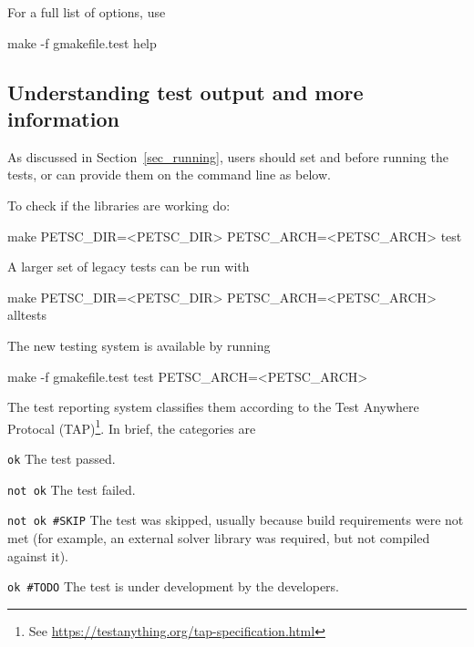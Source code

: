 For a full list of options, use
\begin{bashlisting}
make -f gmakefile.test help
\end{bashlisting}

\subsection{Understanding test output and more information}

As discussed in Section~\ref{sec_running}, 
users should set  and  before running
the tests, or can provide them on the command line as below.

To check if the libraries are working do:
\begin{bashlisting}
make PETSC_DIR=<PETSC_DIR> PETSC_ARCH=<PETSC_ARCH> test
\end{bashlisting}

A larger set of legacy tests can be run with 
\begin{bashlisting}
make PETSC_DIR=<PETSC_DIR> PETSC_ARCH=<PETSC_ARCH> alltests
\end{bashlisting}

The new testing system is available by running
\begin{bashlisting}
make -f gmakefile.test test PETSC_ARCH=<PETSC_ARCH>
\end{bashlisting}

The test reporting system classifies them according to the Test Anywhere
Protocal (TAP)\footnote{See \url{https://testanything.org/tap-specification.html}}.
In brief, the categories are
\begin{tightitemize}
  \item \lstinline{ok}
  \subitem The test passed.
\item \lstinline{not ok}
  \subitem The test failed.
\item \lstinline{not ok #SKIP}
  \subitem The test was skipped, usually because build requirements were not
  met (for example, an external solver library was required, but not
  compiled against it).
\item \lstinline{ok #TODO}
  \subitem The test is under development by the developers.
\end{tightitemize}

